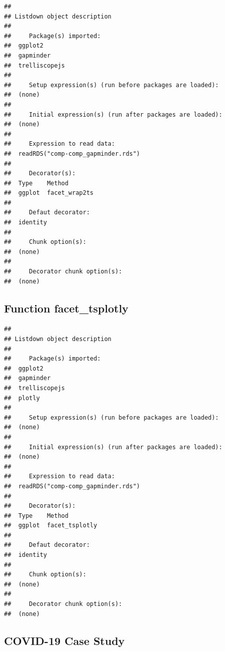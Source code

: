 \documentclass[
]{article}
\begin{document}
\begin{verbatim}
## 
## Listdown object description
## 
##     Package(s) imported:
##  ggplot2
##  gapminder
##  trelliscopejs
## 
##     Setup expression(s) (run before packages are loaded):
##  (none)
## 
##     Initial expression(s) (run after packages are loaded):
##  (none)
## 
##     Expression to read data:
##  readRDS("comp-comp_gapminder.rds")
## 
##     Decorator(s):
##  Type    Method
##  ggplot  facet_wrap2ts
## 
##     Defaut decorator:
##  identity
## 
##     Chunk option(s):
##  (none)
## 
##     Decorator chunk option(s):
##  (none)
\end{verbatim}

\hypertarget{function-facet_tsplotly-1}{%
\subsection{Function facet\_tsplotly}\label{function-facet_tsplotly-1}}

\begin{verbatim}
## 
## Listdown object description
## 
##     Package(s) imported:
##  ggplot2
##  gapminder
##  trelliscopejs
##  plotly
## 
##     Setup expression(s) (run before packages are loaded):
##  (none)
## 
##     Initial expression(s) (run after packages are loaded):
##  (none)
## 
##     Expression to read data:
##  readRDS("comp-comp_gapminder.rds")
## 
##     Decorator(s):
##  Type    Method
##  ggplot  facet_tsplotly
## 
##     Defaut decorator:
##  identity
## 
##     Chunk option(s):
##  (none)
## 
##     Decorator chunk option(s):
##  (none)
\end{verbatim}

\hypertarget{covid-19-case-study}{%
\subsection{COVID-19 Case Study}\label{covid-19-case-study}}
\end{document}
